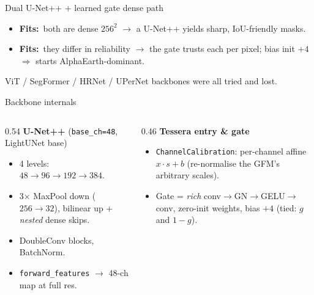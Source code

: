 \documentclass[aspectratio=169,11pt]{beamer}
\newcommand{\fit}{\textcolor{cHead}{\textbf{Fits:}}\ }
\newcommand{\code}[1]{\texttt{\small #1}}
\begin{document}
\begin{frame}{Dual U-Net++ + learned gate \hfill\small\textcolor{cAlpha}{dense path}}
  \begin{center}
  \end{center}
  \begin{itemize}
    \item \fit both are dense $256^2$ $\to$ a U-Net++ yields sharp, IoU-friendly masks.
    \item \fit they differ in reliability $\to$ the gate trusts each per pixel;
      bias init $+4$ $\Rightarrow$ starts AlphaEarth-dominant.
  \end{itemize}
  {\footnotesize ViT / SegFormer / HRNet / UPerNet backbones were all tried and lost.}
\end{frame}

\begin{frame}{Backbone internals}
  \begin{columns}[T]
    \begin{column}{0.54\textwidth}
      \textbf{U-Net++} (\code{base\_ch=48}, LightUNet base)
      \begin{itemize}\small
        \item 4 levels: $48\to96\to192\to384$.
        \item 3$\times$ MaxPool down ($256\to32$), bilinear up + \emph{nested} dense skips.
        \item DoubleConv blocks, BatchNorm.
        \item \code{forward\_features} $\to$ 48-ch map at full res.
      \end{itemize}
    \end{column}
    \begin{column}{0.46\textwidth}
      \textbf{Tessera entry \& gate}
      \begin{itemize}\small
        \item \code{ChannelCalibration}: per-channel affine $x\!\cdot\!s+b$
          (re-normalise the GFM's arbitrary scales).
        \item Gate = \emph{rich} conv$\to$GN$\to$GELU$\to$conv, zero-init weights,
          bias $+4$ (tied: $g$ and $1{-}g$).
      \end{itemize}
    \end{column}
  \end{columns}
\end{frame}
\end{document}

